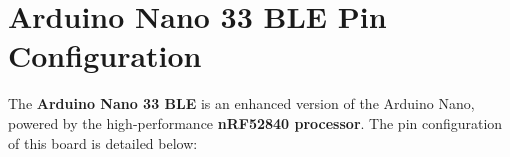 %
%
%
%

\section{Arduino Nano 33 BLE Pin Configuration}

The \textbf{Arduino Nano 33 BLE} is an enhanced version of the Arduino Nano, powered by the high-performance \textbf{nRF52840 processor}. The pin configuration of this board is detailed below:\\
\vspace{1em} %

